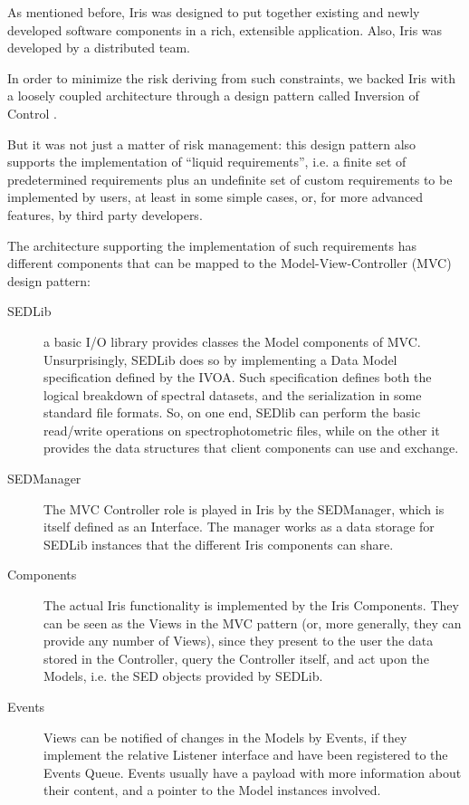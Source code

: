 \documentclass[5p]{elsarticle}
\begin{document}
As mentioned before, Iris was designed to put together existing and newly developed software components in a rich, extensible application. Also, Iris was developed by a distributed team.

In order to minimize the risk deriving from such constraints, we backed Iris with a loosely coupled architecture through a design pattern called Inversion of Control \citep*{ioc}.

But it was not just a matter of risk management: this design pattern also supports the implementation of ``liquid requirements'', i.e. a finite set of predetermined requirements plus an undefinite set of custom requirements to be implemented by users, at least in some simple cases, or, for more advanced features, by third party developers.

The architecture supporting the implementation of such requirements has different components that can be mapped to the Model-View-Controller (MVC) design pattern:
\begin{description}
\item[SEDLib] a basic I/O library provides classes the Model components of MVC. Unsurprisingly, SEDLib does so by implementing a Data Model specification defined by the IVOA. Such specification defines both the logical breakdown of spectral datasets, and the serialization in some standard file formats. So, on one end, SEDlib can perform the basic read/write operations on spectrophotometric files, while on the other it provides the data structures that client components can use and exchange.
\item[SEDManager] The MVC Controller role is played in Iris by the SEDManager, which is itself defined as an Interface. The manager works as a data storage for SEDLib instances that the different Iris components can share.
\item[Components] The actual Iris functionality is implemented by the Iris Components. They can be seen as the Views in the MVC pattern (or, more generally, they can provide any number of Views), since they present to the user the data stored in the Controller, query the Controller itself, and act upon the Models, i.e. the SED objects provided by SEDLib.
\item[Events] Views can be notified of changes in the Models by Events, if they implement the relative Listener interface and have been registered to the Events Queue. Events usually have a payload with more information about their content, and a pointer to the Model instances involved.
\end{description}
\end{document}
